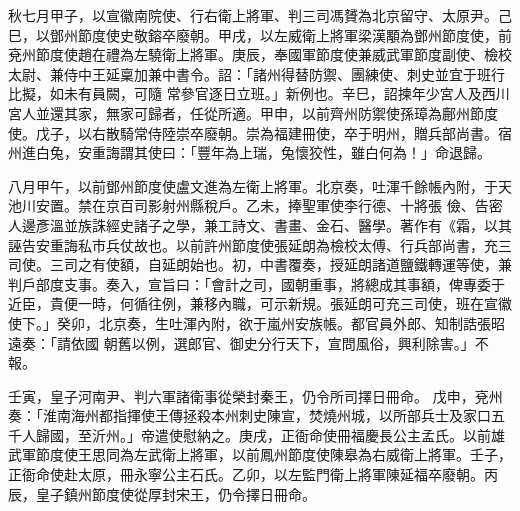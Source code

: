 \begin{pinyinscope}
 秋七月甲子，以宣徽南院使、行右衛上將軍、判三司馮贇為北京留守、太原尹。己巳，以鄧州節度使史敬鎔卒廢朝。甲戌，以左威衛上將軍梁漢顒為鄧州節度使，前兗州節度使趙在禮為左驍衛上將軍。庚辰，奉國軍節度使兼威武軍節度副使、檢校太尉、兼侍中王延稟加兼中書令。詔：「諸州得替防禦、團練使、刺史並宜于班行比擬，如未有員闕，可隨
 常參官逐日立班。」新例也。辛巳，詔揀年少宮人及西川宮人並還其家，無家可歸者，任從所適。甲申，以前齊州防禦使孫璋為鄜州節度使。戊子，以右散騎常侍陸崇卒廢朝。崇為福建冊使，卒于明州，贈兵部尚書。宿州進白兔，安重誨謂其使曰：「豐年為上瑞，兔懷狡性，雖白何為！」命退歸。



 八月甲午，以前鄧州節度使盧文進為左衛上將軍。北京奏，吐渾千餘帳內附，于天池川安置。禁在京百司影射州縣稅戶。乙未，捧聖軍使李行德、十將張
 儉、告密人邊彥溫並族誅經史諸子之學，兼工詩文、書畫、金石、醫學。著作有《霜，以其誣告安重誨私市兵仗故也。以前許州節度使張延朗為檢校太傅、行兵部尚書，充三司使。三司之有使額，自延朗始也。初，中書覆奏，授延朗諸道鹽鐵轉運等使，兼判戶部度支事。奏入，宣旨曰：「會計之司，國朝重事，將總成其事額，俾專委于近臣，貴便一時，何循往例，兼移內職，可示新規。張延朗可充三司使，班在宣徽使下。」癸卯，北京奏，生吐渾內附，欲于嵐州安族帳。都官員外郎、知制誥張昭遠奏：「請依國
 朝舊以例，選郎官、御史分行天下，宣問風俗，興利除害。」不報。


壬寅，皇子河南尹、判六軍諸衛事從榮封秦王，仍令所司擇日冊命。
 戊申，兗州奏：「淮南海州都指揮使王傳拯殺本州刺史陳宣，焚燒州城，以所部兵士及家口五千人歸國，至沂州。」帝遣使慰納之。庚戌，正衙命使冊福慶長公主孟氏。以前雄武軍節度使王思同為左武衛上將軍，以前鳳州節度使陳皋為右威衛上將軍。壬子，正衙命使赴太原，冊永寧公主石氏。乙卯，以左監門衛上將軍陳延福卒廢朝。丙辰，皇子鎮州節度使從厚封宋王，仍令擇日冊命。




\end{pinyinscope}

